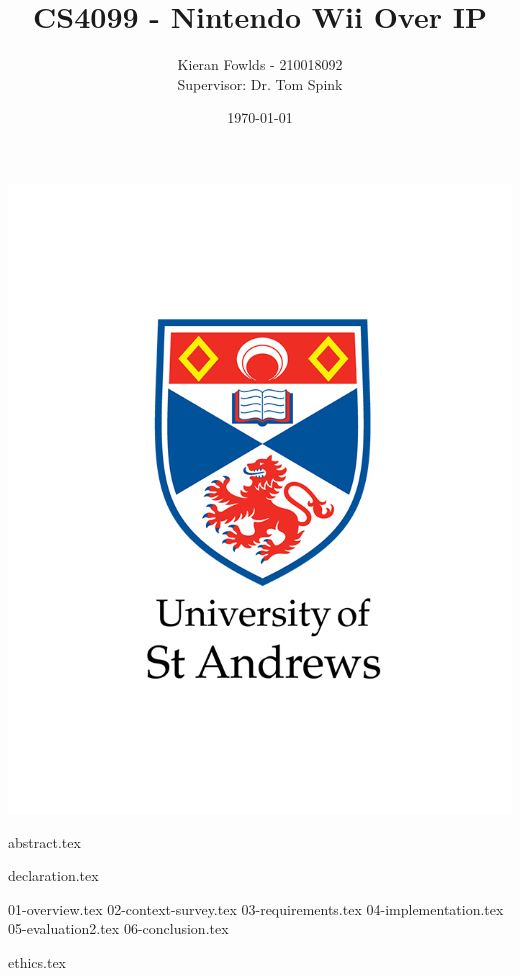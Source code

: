 \documentclass[12pt,abstract=true,headings=standardclasses,titlepage=false]{scrreprt}
\title{CS4099 - Nintendo Wii Over IP}
\author{Kieran Fowlds - 210018092 \\
Supervisor: Dr. Tom Spink}
\date{\today}
\begin{document}
\maketitle
\thispagestyle{empty}
\vfill
\begin{center}
	\includegraphics[width=0.6\linewidth]{figures/logo.png}
\end{center}

\newpage
{abstract.tex}
\thispagestyle{empty}
\clearpage


\newpage
{declaration.tex}
\thispagestyle{empty}
\clearpage

\newpage
\setcounter{page}{1}

\tableofcontents
\clearpage
{}
\setcounter{page}{1}

{01-overview.tex}
{02-context-survey.tex}
{03-requirements.tex}
{04-implementation.tex}
{05-evaluation2.tex}
{06-conclusion.tex}

\printbibliography[title=References]

\appendix
\clearpage
\renewcommand{\thepage}{}
{ethics.tex}
\end{document}
